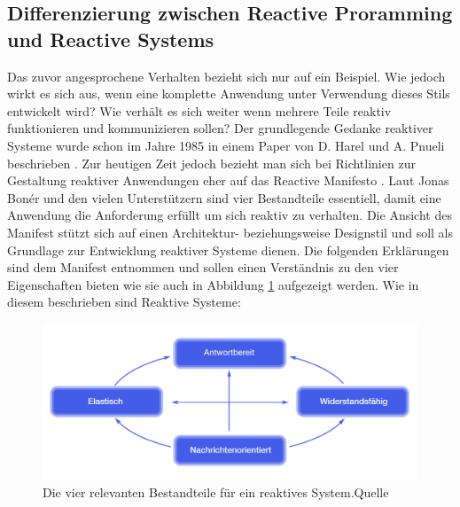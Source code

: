 \subsection{Differenzierung zwischen Reactive Proramming und Reactive Systems}
Das zuvor angesprochene Verhalten bezieht sich nur auf ein Beispiel. Wie jedoch wirkt es sich aus, wenn eine komplette Anwendung unter Verwendung dieses Stils entwickelt wird? Wie verhält es sich weiter wenn mehrere Teile reaktiv funktionieren und kommunizieren sollen? Der grundlegende Gedanke reaktiver Systeme wurde schon im Jahre 1985 in einem Paper von D. Harel und A. Pnueli beschrieben \cite{Harel.1985}. Zur heutigen Zeit jedoch bezieht man sich bei Richtlinien zur Gestaltung reaktiver Anwendungen eher auf das Reactive Manifesto \cite{Boner.2014}. Laut Jonas Bonér und den vielen Unterstützern sind vier Bestandteile essentiell, damit eine Anwendung die Anforderung erfüllt um sich reaktiv zu verhalten. Die Ansicht des Manifest stützt sich auf einen Architektur- beziehungsweise Designstil und soll als Grundlage zur Entwicklung reaktiver Systeme dienen. Die folgenden Erklärungen sind dem Manifest entnommen und sollen einen Verständnis zu den vier Eigenschaften bieten wie sie auch in Abbildung \ref{pic:manifest4} aufgezeigt werden. Wie in diesem beschrieben sind Reaktive Systeme:
\begin{figure}
	\centering
	\includegraphics[width=1\textwidth]{Abb/manifest4achsen.PNG}
	\caption{Die vier relevanten Bestandteile für ein reaktives System.Quelle \cite{Boner.2014}}
	\label{pic:manifest4}
\end{figure}
